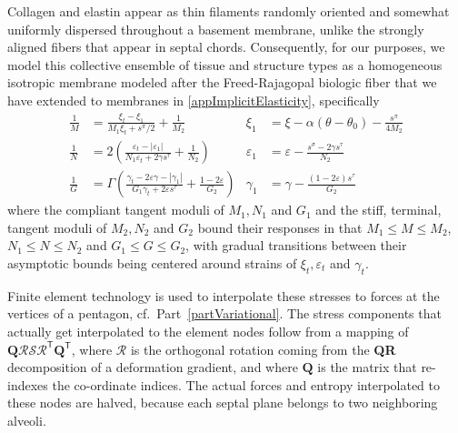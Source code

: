 Collagen and elastin appear as thin filaments randomly oriented and somewhat uniformly dispersed throughout a basement membrane, unlike the strongly aligned fibers that appear in septal chords.  Consequently, for our purposes, we model this collective ensemble of tissue and structure types as a homo\-geneous isotropic membrane modeled after the Freed-Rajagopal biologic fiber \cite{FreedRajagopal16} that we have extended to membranes in \ref{appImplicitElasticity}, specifically
\begin{subequations}
    \label{septalCompliances}
    \begin{align}
    \frac{1}{M} & = \frac{\xi_t - \xi_1}{M_1 \xi_t + s^{\pi} / 2} + \frac{1}{M_2} &
    \xi_1 & = \xi - \alpha ( \theta - \theta_0 ) - \frac{s^{\pi}}{4M_2}
    \label{septalDilationCompliance} \\
    \frac{1}{N} & = 2 \left( \frac{ \varepsilon_t - | \varepsilon_1 |}{N_1 \varepsilon_t + 2 \gamma s^{\tau}} + \frac{1}{N_2} \right) & 
    \varepsilon_1 & = \varepsilon - \frac{s^{\sigma} - 2 \gamma s^{\tau}}{N_2}
    \label{septalSqueezeCompliance} \\
    \frac{1}{G} & = \Gamma \left( \frac{\gamma_t - 2\varepsilon \gamma - | \gamma_1 |}{G_1 \gamma_t + 2 \varepsilon s^{\tau}} + \frac{1-2\varepsilon}{G_2} \right) & 
    \gamma_1 & = \gamma - \frac{(1 - 2\varepsilon) s^{\tau}}{G_2}
    \label{septalShearCompliance}
    \end{align}
\end{subequations}
where the compliant tangent moduli of $M_1, N_1$ and $G_1$ and the stiff, terminal, tangent moduli of $M_2 , N_2$ and $G_2$ bound their responses in that $M_1 \leq M \leq M_2$, $N_1 \leq N \leq N_2$ and $G_1 \leq G \leq G_2$, with gradual transitions between their asymptotic bounds being centered around strains of $\xi_t , \varepsilon_t$ and $\gamma_t$.

Finite element technology is used to interpolate these stresses to forces at the vertices of a pentagon, cf.\ Part~\ref{partVariational}.  The stress components that actually get interpolated to the element nodes follow from a mapping of $\mathbf{Q} \boldsymbol{\mathcal{RSR}}^{\mathsf{T}} \mathbf{Q}^{\mathsf{T}}$, where $\boldsymbol{\mathcal{R}}$ is the orthogonal rotation coming from the \textbf{QR} decomposition of a deformation gradient, and where $\mathbf{Q}$ is the matrix that re-indexes the co-ordinate indices.  The actual forces and entropy interpolated to these nodes are halved, because each septal plane belongs to two neighboring alveoli. 

